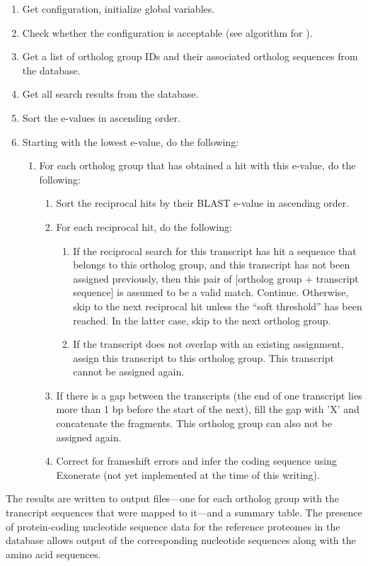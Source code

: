 \begin{enumerate}
	\item Get configuration, initialize global variables.
	\item Check whether the configuration is acceptable (see algorithm for
		).
	\item Get a list of ortholog group IDs and their associated ortholog sequences
		from the database.
	\item Get all search results from the database.
	\item Sort the  e-values in ascending order.
	\item Starting with the lowest  e-value, do the following:
	\begin{enumerate}
		\item For each ortholog group that has obtained a  hit with this
			e-value, do the following:
			\begin{enumerate}
				\item Sort the reciprocal hits by their BLAST e-value in ascending order.
				\item For each reciprocal hit, do the following:
				\begin{enumerate}
					\item If the reciprocal search for this transcript has hit a sequence
						that belongs to this ortholog group, and this transcript has not been
						assigned previously, then this pair of [ortholog group + transcript
						sequence] is assumed to be a valid match.  Continue. Otherwise, skip
						to the next reciprocal hit unless the ``soft threshold'' has been
						reached. In the latter case, skip to the next ortholog group.
					\item If the transcript does not overlap with an existing assignment,
						assign this transcript to this ortholog group. This transcript cannot
						be assigned again.
				\end{enumerate}
			\item If there is a gap between the transcripts (the end of one transcript
				lies more than 1 bp before the start of the next), fill the gap with
				'X' and concatenate the fragments. This ortholog group can also not be
				assigned again.
			\item Correct for frameshift errors and infer the coding sequence using
				Exonerate (not yet implemented at the time of this writing).
		\end{enumerate}
	\end{enumerate}
\end{enumerate}

The results are written to output files---one for each ortholog group with the
transcript sequences that were mapped to it---and a summary table. The presence
of protein-coding nucleotide sequence data for the reference proteomes in the
database allows output of the corresponding nucleotide sequences along with the
amino acid sequences.



